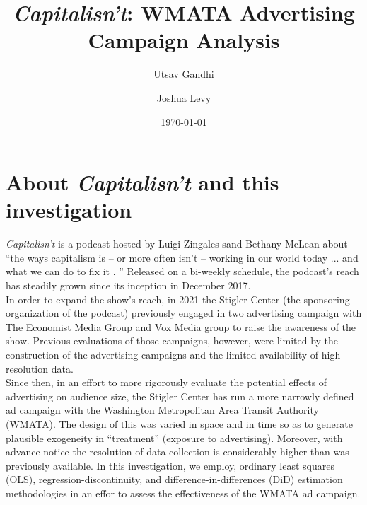 \documentclass[11pt, letterpaper, twoside]{article}
\title{\singlespacing\textit{Capitalisn't}: WMATA Advertising Campaign Analysis}
\author{
   Utsav Gandhi
   \and
   Joshua Levy
}
\date{\today}
\begin{document}
\begin{titlepage}   
    \maketitle
    \thispagestyle{empty}
\end{titlepage}





\newpage
{}

\section{About \textit{Capitalisn't} and this investigation}
\textit{Capitalisn't} is a podcast hosted by Luigi Zingales sand Bethany McLean about ``the ways capitalism is -- or more often isn't -- working in our world today ... and what we can do to fix it . '' Released on a bi-weekly schedule, the podcast's reach has steadily grown since its inception in December 2017.\\

In order to expand the show's reach, in 2021 the Stigler Center (the sponsoring organization of the podcast) previously engaged in two advertising campaign with The Economist Media Group and Vox Media group to raise the awareness of the show. Previous evaluations of those campaigns, however, were limited by the construction of the advertising campaigns and the limited availability of high-resolution data.\\

Since then, in an effort to more rigorously evaluate the potential effects of advertising on audience size, the Stigler Center has run a more narrowly defined ad campaign with the Washington Metropolitan Area Transit Authority (WMATA). The design of this was varied in space and in time so as to generate plausible exogeneity in ``treatment'' (exposure to advertising). Moreover, with advance notice the resolution of data collection is considerably higher than was previously available. In this investigation, we employ, ordinary least squares (OLS), regression-discontinuity, and difference-in-differences (DiD) estimation methodologies in an effor to assess the effectiveness of the WMATA ad campaign.
\end{document}
